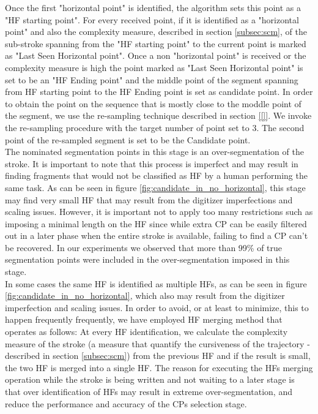 \documentclass[journal,compsoc]{IEEEtran}
\begin{document}
Once the first "horizontal point" is identified, the algorithm sets this point as a "HF starting point". For every received point, if it is identified as a "horizontal point" and also the complexity measure, described in section \ref{subsec:scm}, of the sub-stroke spanning from the "HF starting point" to the current point is marked as "Last Seen Horizontal point". Once a non "horizontal point" is received or the complexity measure is high the point marked as "Last Seen Horizontal point" is set to be an "HF Ending point" and the middle point of the segment spanning from HF starting point to the HF Ending point is set as candidate point. In order to obtain the point on the sequence that is mostly close to the moddle point of the segment, we use the re-sampling technique described in section \ref{[]}. We invoke the re-sampling procedure with the target number of point set to 3. The second point of the re-sampled segment is set to be the Candidate point.\\

The nominated segmentation points in this stage is an over-segmentation of the stroke. It is important to note that this process is imperfect and may result in finding fragments that would not be classified as HF by a human performing the same task. As can be seen in figure \ref{fig:candidate_in_no_horizontal}, this stage may find very small HF that may result from the digitizer imperfections and scaling issues. However, it is important not to apply too many restrictions such as imposing a minimal length on the HF since while extra CP can be easily filtered out in a later phase when the entire stroke is available, failing to find a CP can't be recovered. In our experiments we observed that more than 99\% of true segmentation points were included in the over-segmentation imposed in this stage.\\

In some cases the same HF is identified as multiple HFs, as can be seen in figure \ref{fig:candidate_in_no_horizontal}, which also may result from the digitizer imperfection and scaling issues. In order to avoid, or at least to minimize, this to happen frequently frequently, we have employed HF merging method that operates as follows: At every HF identification, we calculate the complexity measure of the stroke (a measure that quantify the cursiveness of the trajectory - described in section \ref{subsec:scm}) from the previous HF and if the result is small, the two HF is merged into a single HF. The reason for executing the HFs merging operation while the stroke is being written and not waiting to a later stage is that over identification of HFs may result in extreme over-segmentation, and reduce the performance and accuracy of the CPs selection stage.
\end{document}
